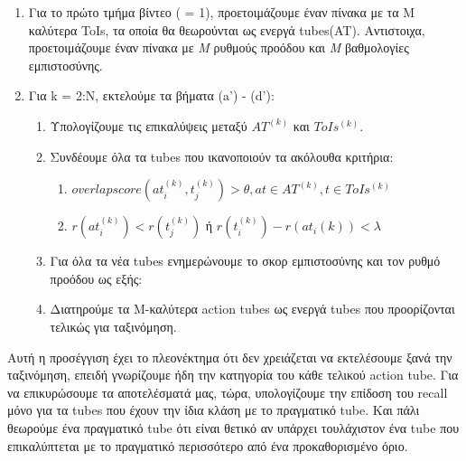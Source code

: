 \begin{enumerate}
\item Για το πρώτο τμήμα βίντεο ( = 1), προετοιμάζουμε έναν πίνακα με τα Μ καλύτερα \en ToIs\gr,  τα  οποία θα θεωρούνται
  ως ενεργά  \en tubes\gr(AT).
Αντιστοιχα, προετοιμάζουμε έναν πίνακα με \textit{M} ρυθμούς προόδου και \textit{M} βαθμολογίες εμπιστοσύνης.
\item Για \en k = 2:N\gr, εκτελούμε τα βήματα (a') - (d'):
  \begin{enumerate}
  \item Υπολογίζουμε τις επικαλύψεις μεταξύ $ AT^{(k)} $ και $ ToIs^{(k)}. $
  \item Συνδέουμε όλα τα \en tubes \gr που ικανοποιούν τα ακόλουθα κριτήρια:
    \begin{enumerate}
    \item $ overlap score(at_i^{(k)},t_j^{(k)})   > \theta, 
      at  \in AT^{(k)}, t \in ToIs^{(k)}  $
    \item $r(at_i^{(k)}) < r(t_j^{(k)}) $ ή
      $r(t_i^{(k)}) - r(at_i{(k)}) < \lambda $
    \end{enumerate}
    
  \item Για όλα τα νέα \en tubes \gr ενημερώνουμε το σκορ εμπιστοσύνης και τον ρυθμό προόδου ως εξής:

  \item Διατηρούμε  τα M-καλύτερα \en action tubes \gr  ως ενεργά \en tubes \gr που προορίζονται τελικώς για ταξινόμηση.
  \end{enumerate}
  
\end{enumerate}

Αυτή η προσέγγιση έχει το πλεονέκτημα ότι δεν χρειάζεται να εκτελέσουμε ξανά την ταξινόμηση, επειδή γνωρίζουμε ήδη την κατηγορία του
κάθε τελικού \en action tube\gr. Για να επικυρώσουμε τα αποτελέσματά μας, τώρα, υπολογίζουμε την επίδοση του \en recall \gr μόνο για τα \en tubes \gr
που έχουν την ίδια κλάση με το πραγματικό \en tube\gr. Και πάλι θεωρούμε ένα πραγματικό  \en tube \gr ότι είναι θετικό αν υπάρχει
τουλάχιστον ένα \en tube \gr που επικαλύπτεται με το πραγματικό περισσότερο από ένα προκαθορισμένο όριο.

